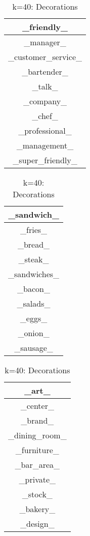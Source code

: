 \documentclass{article}
\begin{document}
\begin{table}[ht]
    \parbox{.25\linewidth}{
    \centering
    \begin{tabular}{|c|}
    \hline
    \_friendly\_\\
    \hline
    \_manager\_\\
    \hline
    \_customer\_service\_\\
    \hline
    \_bartender\_\\
    \hline
    \_talk\_\\
    \hline
    \_company\_\\
    \hline
    \_chef\_\\
    \hline
    \_professional\_\\
    \hline
    \_management\_\\
    \hline
    \_super\_friendly\_\\
    \hline
    \end{tabular}
    \caption{k=40: Customer Service}
    }
    \hfill
    \parbox{.25\linewidth}{
    \centering
    \begin{tabular}{|c|}
    \hline
    \_sandwich\_\\
    \hline
    \_fries\_\\
    \hline
    \_bread\_\\
    \hline
    \_steak\_\\
    \hline
    \_sandwiches\_\\
    \hline
    \_bacon\_\\
    \hline
    \_salads\_\\
    \hline
    \_eggs\_\\
    \hline
    \_onion\_\\
    \hline
    \_sausage\_\\
    \hline
    \end{tabular}
    \caption{k=40: Food Items}
    }
    \hfill
    \parbox{.25\linewidth}{
    \centering
    \begin{tabular}{|c|}
    \hline
    \_art\_\\
    \hline
    \_center\_\\
    \hline
    \_brand\_\\
    \hline
    \_dining\_room\_\\
    \hline
    \_furniture\_\\
    \hline
    \_bar\_area\_\\
    \hline
    \_private\_\\
    \hline
    \_stock\_\\
    \hline
    \_bakery\_\\
    \hline
    \_design\_\\
    \hline
    \end{tabular}
    \caption{k=40: Decorations}
    }
\end{table}\\
\end{document}
